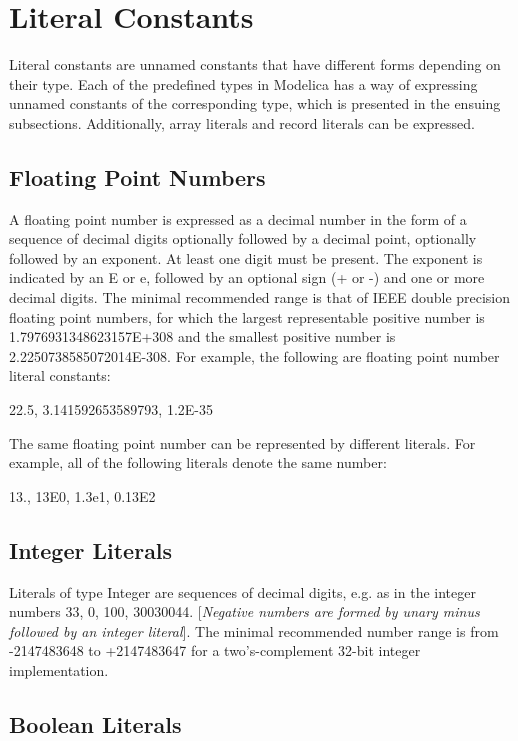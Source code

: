 \documentclass[10pt,a4paper]{report}
\def\Mcomment#1{{[}\emph{#1}{]}}
\begin{document}
\section{Literal Constants}

Literal constants are unnamed constants that have different forms
depending on their type. Each of the predefined types in Modelica has a
way of expressing unnamed constants of the corresponding type, which is
presented in the ensuing subsections. Additionally, array literals and
record literals can be expressed.

\subsection{Floating Point Numbers}

A floating point number is expressed as a decimal number in the form of
a sequence of decimal digits optionally followed by a decimal point,
optionally followed by an exponent. At least one digit must be present.
The exponent is indicated by an E or e, followed by an optional sign (+
or -) and one or more decimal digits. The minimal recommended range is
that of IEEE double precision floating point numbers, for which the
largest representable positive number is 1.7976931348623157E+308 and the
smallest positive number is 2.2250738585072014E-308. For example, the
following are floating point number literal constants:

22.5, 3.141592653589793, 1.2E-35

The same floating point number can be represented by different literals.
For example, all of the following literals denote the same number:

13., 13E0, 1.3e1, 0.13E2

\subsection{Integer Literals}

Literals of type Integer are sequences of decimal digits, e.g. as in the
integer numbers 33, 0, 100, 30030044. \Mcomment{Negative numbers are
formed by unary minus followed by an integer literal}. The minimal
recommended number range is from -2147483648 to +2147483647 for a
two's-complement 32-bit integer implementation.

\subsection{Boolean Literals}
\end{document}
